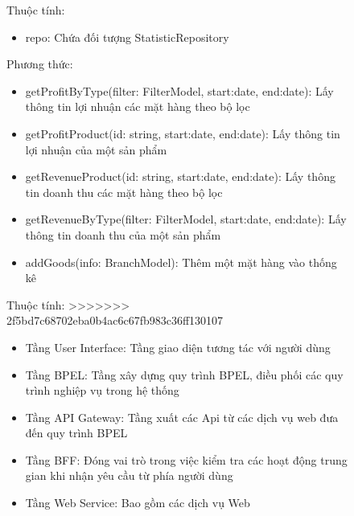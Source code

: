 \begin{figure}[!htp]
Thuộc tính:
\begin{itemize}
	\item repo: Chứa đối tượng StatisticRepository
\end{itemize}
Phương thức:
\begin{itemize}
	\item getProfitByType(filter: FilterModel, start:date,
	end:date): Lấy thông tin lợi nhuận các mặt hàng theo bộ lọc
	\item getProfitProduct(id: string, start:date,
	end:date): Lấy thông tin lợi nhuận của một sản phẩm
	\item getRevenueProduct(id: string, start:date,
	end:date): Lấy thông tin doanh thu các mặt hàng theo bộ lọc
	\item getRevenueByType(filter: FilterModel, start:date,
	end:date): Lấy thông tin doanh thu của một sản phẩm
	\item addGoods(info: BranchModel): Thêm một mặt hàng vào thống kê
\end{itemize}

Thuộc tính:
>>>>>>> 2f5bd7c68702eba0b4ac6c67fb983c36ff130107
\begin{itemize}
	\item Tầng User Interface: Tầng giao diện tương tác với người dùng
	\item Tầng BPEL: Tầng xây dựng quy trình BPEL, điều phối các quy trình nghiệp vụ trong hệ thống
	\item Tầng API Gateway: Tầng xuất các Api từ các dịch vụ web đưa đến quy trình BPEL
	\item Tầng BFF: Đóng vai trò trong việc kiểm tra các hoạt động trung gian khi nhận yêu cầu từ phía người dùng
	\item Tầng Web Service: Bao gồm các dịch vụ Web 
\end{itemize}




\end{figure}
